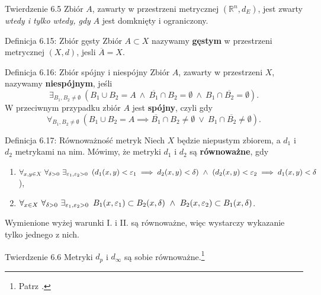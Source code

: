 \documentclass{article}
\newcommand{\hquad}{\mkern9mu}
\newcommand{\R}{\mathbb{R}}
\newcommand*\closure[1]{\overline{#1}}
\begin{document}
\begin{twier}{Twierdzenie 6.5}
    Zbiór $A$, zawarty w przestrzeni metrycznej $(\R^n,d_E)$, jest zwarty \textit{wtedy i tylko wtedy, gdy} $A$ jest
    domknięty i ograniczony.
\end{twier}

\begin{defr}{Definicja 6.15: Zbiór gęsty}
    Zbiór $A\subset X$ nazywamy \textbf{gęstym} w przestrzeni metrycznej $(X,d)$, jesli $\closure{A}=X$. 
\end{defr}

\begin{defr}{Definicja 6.16: Zbiór spójny i niespójny}
    Zbiór $A$, zawarty w przestrzeni $X$, nazywamy \textbf{niespójnym}, jeśli 
    \begin{equation*}
        \exists_{B_1,B_2\neq\emptyset}\ \left(B_1\cup B_2=A\ \land\ \closure{B_1}\cap B_2=\emptyset\ \land\ B_1\cap\closure{B_2}=\emptyset\right). 
    \end{equation*}
    W przeciwnym przypadku zbiór $A$ jest \textbf{spójny}, czyli gdy
    \begin{equation*}
        \forall_{B_1,B_2\neq\emptyset}\ \left(B_1\cup B_2=A\implies\closure{B_1}\cap B_2\neq\emptyset\ \lor\ B_1\cap\closure{B_2}\neq\emptyset\right).
    \end{equation*}
\end{defr}

\begin{defr}{Definicja 6.17: Równoważność metryk}
    Niech $X$ będzie niepustym zbiorem, a $d_1$ i $d_2$ metrykami na nim. Mówimy, że metryki $d_1$ i $d_2$ są \textbf{równoważne}, gdy
    \begin{enumerate}[label=\Roman*.]
        \item $\forall_{x,y\in X}\ \forall_{\delta>0}\ \exists_{\varepsilon_1,\varepsilon_2>0}\hquad
        (d_1(x,y)<\varepsilon_1\implies d_2(x,y)<\delta)\ \land\ (d_2(x,y)<\varepsilon_2\implies d_1(x,y)<\delta$),
        \item $\forall_{x\in X}\ \forall_{\delta>0}\ \exists_{\varepsilon_1,\varepsilon_2>0}\hquad
        B_1(x,\varepsilon_1)\subset B_2(x,\delta)\ \land\ B_2(x,\varepsilon_2)\subset B_1(x,\delta)$.
    \end{enumerate}
\end{defr}
Wymienione wyżej warunki I. i II. są równoważne, więc wystarczy wykazanie tylko jednego z nich.

\begin{twier}{Twierdzenie 6.6}
    Metryki $d_p$ i $d_\infty$ są sobie równoważne.\footnote{Patrz \textit{.}}
\end{twier}
\end{document}
